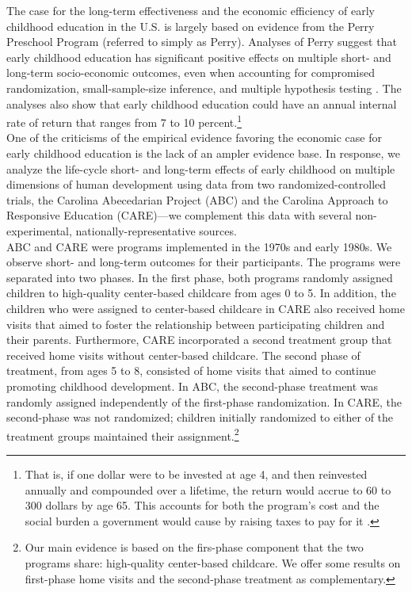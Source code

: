 \noindent  The case for the long-term effectiveness and the economic efficiency of early childhood education in the U.S. is largely based on evidence from the Perry Preschool Program (referred to simply as Perry). Analyses of Perry suggest that early childhood education has significant positive effects on multiple short- and long-term socio-economic outcomes, even when accounting for compromised randomization, small-sample-size inference, and multiple hypothesis testing \citep{Heckman_Moon_etal_2010_QE}. The analyses also show that early childhood education could have an annual internal rate of return that ranges from 7 to 10 percent.\footnote{That is, if one dollar were to be invested at age 4, and then reinvested annually and compounded over a lifetime, the return would accrue to 60 to 300 dollars by age 65. This accounts for both the program's cost and the social burden a government would cause by raising taxes to pay for it \citep{Heckman_Moon_etal_2010_RateofReturn}.}\\

\noindent One of the criticisms of the empirical evidence favoring the economic case for early childhood education is the lack of an ampler evidence base. In response, we analyze the life-cycle short- and long-term effects of early childhood on multiple dimensions of human development using data from two randomized-controlled trials, the Carolina Abecedarian Project (ABC) and the Carolina Approach to Responsive Education (CARE)---we complement this data with several non-experimental, nationally-representative sources.\\

\noindent ABC and CARE were programs implemented in the 1970s and early 1980s. We observe short- and long-term outcomes for their participants. The programs were separated into two phases. In the first phase, both programs randomly assigned children to high-quality center-based childcare from ages 0 to 5. In addition, the children who were assigned to center-based childcare in CARE also received home visits that aimed to foster the relationship between participating children and their parents. Furthermore, CARE incorporated a second treatment group that received home visits without center-based childcare. The second phase of treatment, from ages 5 to 8, consisted of home visits that aimed to continue promoting childhood development. In ABC, the second-phase treatment was randomly assigned independently of the first-phase randomization. In CARE, the second-phase was not randomized; children initially randomized to either of the treatment groups maintained their assignment.\footnote{Our main evidence is based on the firs-phase component that the two programs share: high-quality center-based childcare. We offer some results on first-phase home visits and the second-phase treatment as complementary.}\\

